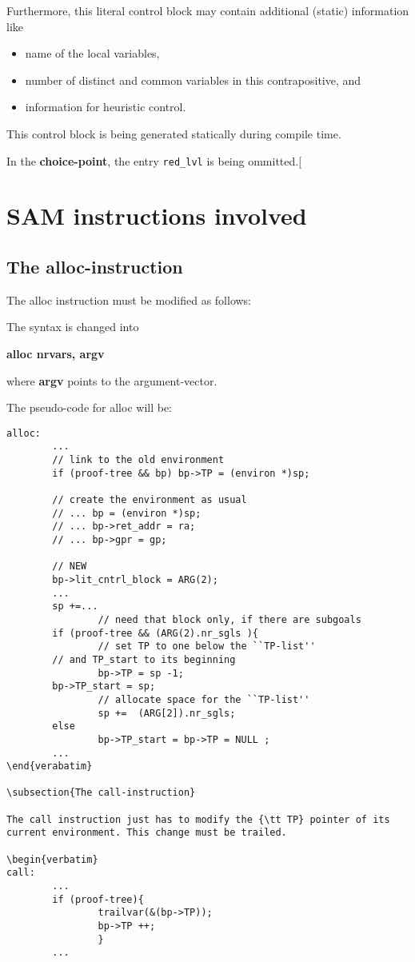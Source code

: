 Furthermore, this literal control block may contain additional
(static) information like
\begin{itemize}
\item
name of the local variables,
\item
number of distinct and common variables in this contrapositive, and
\item
information for heuristic control.
\end{itemize}

This control block is being generated statically during compile time.
    

In the {\bf choice-point}, the entry {\tt red\_lvl} is being ommitted.[

\section{SAM instructions involved}

\subsection{The alloc-instruction}

The alloc instruction must be modified as follows:

The syntax is changed into 
\centerline{\bf alloc nrvars, argv}
where {\bf argv} points to the argument-vector.

The pseudo-code for alloc will be:

\begin{verbatim}
alloc:
        ...
        // link to the old environment
        if (proof-tree && bp) bp->TP = (environ *)sp;

        // create the environment as usual
        // ... bp = (environ *)sp;
        // ... bp->ret_addr = ra;
        // ... bp->gpr = gp;

        // NEW
        bp->lit_cntrl_block = ARG(2);
        ...
        sp +=...
                // need that block only, if there are subgoals
        if (proof-tree && (ARG(2).nr_sgls ){
                // set TP to one below the ``TP-list''
		// and TP_start to its beginning
                bp->TP = sp -1;      
		bp->TP_start = sp;
                // allocate space for the ``TP-list''
                sp +=  (ARG[2]).nr_sgls;
        else
                bp->TP_start = bp->TP = NULL ;      
        ...
\end{verabatim}

\subsection{The call-instruction}

The call instruction just has to modify the {\tt TP} pointer of its
current environment. This change must be trailed.

\begin{verbatim}
call:
        ...
        if (proof-tree){
                trailvar(&(bp->TP));
                bp->TP ++;
                }
        ...
\end{verbatim}

